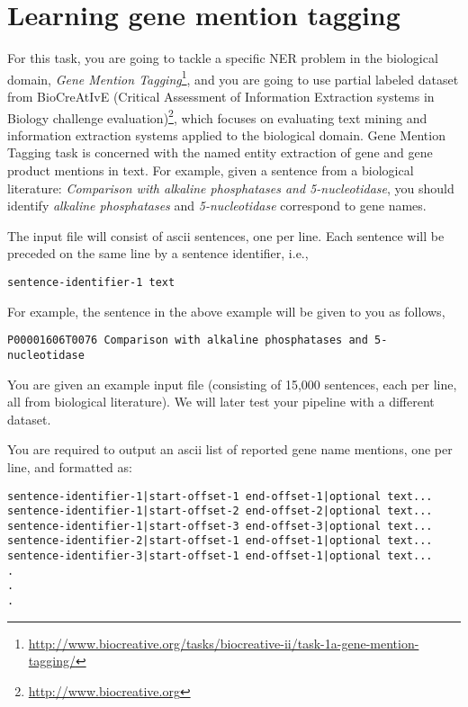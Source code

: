 
\section{Learning gene mention tagging}

For this task, you are going to tackle a specific NER problem in the biological
domain, \emph{Gene Mention
Tagging}\footnote{\url{http://www.biocreative.org/tasks/biocreative-ii/task-1a-gene-mention-tagging/}},
and you are going to use partial labeled dataset from BioCreAtIvE (Critical
Assessment of Information Extraction systems in Biology challenge
evaluation)\footnote{\url{http://www.biocreative.org}}, which focuses on
evaluating text mining and information extraction systems applied to the
biological domain. Gene Mention Tagging task is concerned with the named entity
extraction of gene and gene product mentions in text. For example, given a
sentence from a biological literature: \emph{Comparison with alkaline
phosphatases and 5-nucleotidase}, you should identify \emph{alkaline
phosphatases} and \emph{5-nucleotidase} correspond to gene names.

The input file will consist of ascii sentences, one per line. Each sentence will
be preceded on the same line by a sentence identifier, i.e.,

\begin{verbatim}
sentence-identifier-1 text
\end{verbatim}

For example, the sentence in the above example will be given to you as follows,

\begin{verbatim}
P00001606T0076 Comparison with alkaline phosphatases and 5-nucleotidase
\end{verbatim}

You are given an example input file (consisting of 15,000 sentences, each per
line, all from biological literature). We will later test your pipeline with a
different dataset.

You are required to output an ascii list of reported gene name mentions, one per
line, and formatted as:

\begin{verbatim}
sentence-identifier-1|start-offset-1 end-offset-1|optional text... 
sentence-identifier-1|start-offset-2 end-offset-2|optional text... 
sentence-identifier-1|start-offset-3 end-offset-3|optional text... 
sentence-identifier-2|start-offset-1 end-offset-1|optional text... 
sentence-identifier-3|start-offset-1 end-offset-1|optional text... 
. 
. 
. 
\end{verbatim}

